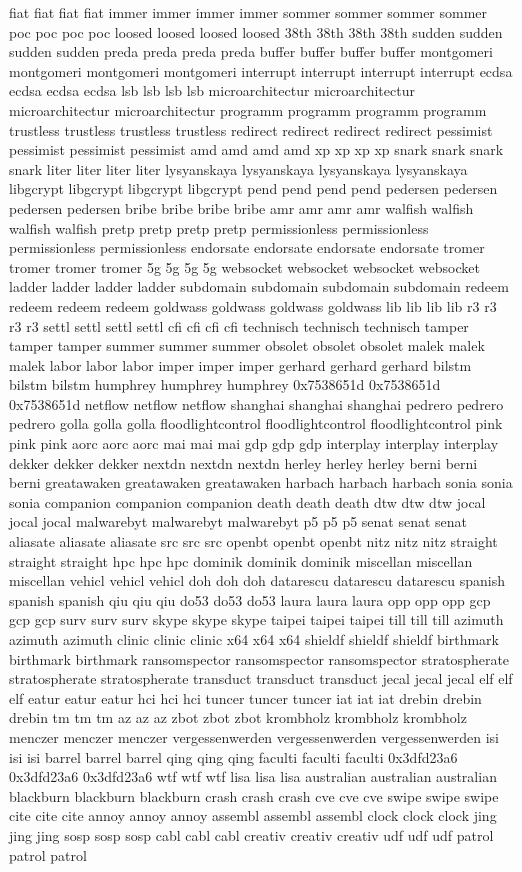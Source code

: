 \documentclass[conference]{IEEEtran}
\begin{document}
fiat fiat fiat fiat immer immer immer immer sommer sommer sommer sommer poc poc poc poc loosed loosed loosed loosed 38th 38th 38th 38th sudden sudden sudden sudden preda preda preda preda buffer buffer buffer buffer montgomeri montgomeri montgomeri montgomeri interrupt interrupt interrupt interrupt ecdsa ecdsa ecdsa ecdsa lsb lsb lsb lsb microarchitectur microarchitectur microarchitectur microarchitectur programm programm programm programm trustless trustless trustless trustless redirect redirect redirect redirect pessimist pessimist pessimist pessimist amd amd amd amd xp xp xp xp snark snark snark snark liter liter liter liter lysyanskaya lysyanskaya lysyanskaya lysyanskaya libgcrypt libgcrypt libgcrypt libgcrypt pend pend pend pend pedersen pedersen pedersen pedersen bribe bribe bribe bribe amr amr amr amr walfish walfish walfish walfish pretp pretp pretp pretp permissionless permissionless permissionless permissionless endorsate endorsate endorsate endorsate tromer tromer tromer tromer 5g 5g 5g 5g websocket websocket websocket websocket ladder ladder ladder ladder subdomain subdomain subdomain subdomain redeem redeem redeem redeem goldwass goldwass goldwass goldwass lib lib lib lib r3 r3 r3 r3 settl settl settl settl cfi cfi cfi cfi technisch technisch technisch tamper tamper tamper summer summer summer obsolet obsolet obsolet malek malek malek labor labor labor imper imper imper gerhard gerhard gerhard bilstm bilstm bilstm humphrey humphrey humphrey 0x7538651d 0x7538651d 0x7538651d netflow netflow netflow shanghai shanghai shanghai pedrero pedrero pedrero golla golla golla floodlightcontrol floodlightcontrol floodlightcontrol pink pink pink aorc aorc aorc mai mai mai gdp gdp gdp interplay interplay interplay dekker dekker dekker nextdn nextdn nextdn herley herley herley berni berni berni greatawaken greatawaken greatawaken harbach harbach harbach sonia sonia sonia companion companion companion death death death dtw dtw dtw jocal jocal jocal malwarebyt malwarebyt malwarebyt p5 p5 p5 senat senat senat aliasate aliasate aliasate src src src openbt openbt openbt nitz nitz nitz straight straight straight hpc hpc hpc dominik dominik dominik miscellan miscellan miscellan vehicl vehicl vehicl doh doh doh datarescu datarescu datarescu spanish spanish spanish qiu qiu qiu do53 do53 do53 laura laura laura opp opp opp gcp gcp gcp surv surv surv skype skype skype taipei taipei taipei till till till azimuth azimuth azimuth clinic clinic clinic x64 x64 x64 shieldf shieldf shieldf birthmark birthmark birthmark ransomspector ransomspector ransomspector stratospherate stratospherate stratospherate transduct transduct transduct jecal jecal jecal elf elf elf eatur eatur eatur hci hci hci tuncer tuncer tuncer iat iat iat drebin drebin drebin tm tm tm az az az zbot zbot zbot krombholz krombholz krombholz menczer menczer menczer vergessenwerden vergessenwerden vergessenwerden isi isi isi barrel barrel barrel qing qing qing faculti faculti faculti 0x3dfd23a6 0x3dfd23a6 0x3dfd23a6 wtf wtf wtf lisa lisa lisa australian australian australian blackburn blackburn blackburn crash crash crash cve cve cve swipe swipe swipe cite cite cite annoy annoy annoy assembl assembl assembl clock clock clock jing jing jing sosp sosp sosp cabl cabl cabl creativ creativ creativ udf udf udf patrol patrol patrol 
\end{document}
